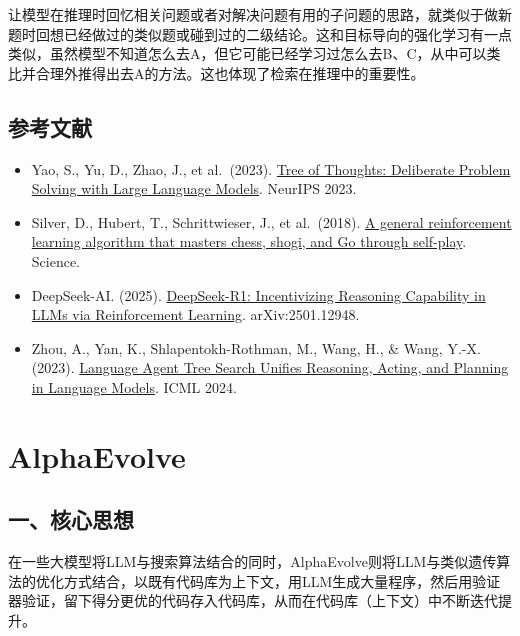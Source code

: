 让模型在推理时回忆相关问题或者对解决问题有用的子问题的思路，就类似于做新题时回想已经做过的类似题或碰到过的二级结论。这和目标导向的强化学习有一点类似，虽然模型不知道怎么去A，但它可能已经学习过怎么去B、C，从中可以类比并合理外推得出去A的方法。这也体现了检索在推理中的重要性。

\hypertarget{ux53c2ux8003ux6587ux732e-124}{%
\subsection{参考文献}\label{ux53c2ux8003ux6587ux732e-124}}

\begin{itemize}
\tightlist
\item
  Yao, S., Yu, D., Zhao, J., et al.~(2023). \href{https://arxiv.org/abs/2305.10601}{Tree of Thoughts: Deliberate Problem Solving with Large Language Models}. NeurIPS 2023.
\item
  Silver, D., Hubert, T., Schrittwieser, J., et al.~(2018). \href{https://www.science.org/doi/10.1126/science.aar6404}{A general reinforcement learning algorithm that masters chess, shogi, and Go through self-play}. Science.
\item
  DeepSeek-AI. (2025). \href{https://arxiv.org/abs/2501.12948}{DeepSeek-R1: Incentivizing Reasoning Capability in LLMs via Reinforcement Learning}. arXiv:2501.12948.
\item
  Zhou, A., Yan, K., Shlapentokh-Rothman, M., Wang, H., \& Wang, Y.-X. (2023). \href{https://arxiv.org/abs/2310.04406}{Language Agent Tree Search Unifies Reasoning, Acting, and Planning in Language Models}. ICML 2024.
\end{itemize}

\clearpage

\hypertarget{alphaevolve}{%
\section{AlphaEvolve}\label{alphaevolve}}

\hypertarget{ux4e00ux6838ux5fc3ux601dux60f3-10}{%
\subsection{一、核心思想}\label{ux4e00ux6838ux5fc3ux601dux60f3-10}}

在一些大模型将LLM与搜索算法结合的同时，AlphaEvolve则将LLM与类似遗传算法的优化方式结合，以既有代码库为上下文，用LLM生成大量程序，然后用验证器验证，留下得分更优的代码存入代码库，从而在代码库（上下文）中不断迭代提升。

